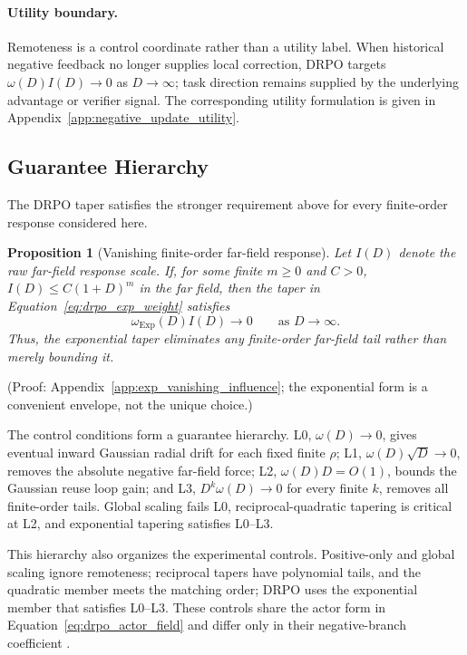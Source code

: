 \documentclass{article}
\theoremstyle{plain}
\newtheorem{proposition}[theorem]{Proposition}
\theoremstyle{definition}
\theoremstyle{remark}
\begin{document}
\paragraph{Utility boundary.}
\label{subsec:distance_dependent_utility}
Remoteness is a control coordinate rather than a utility label. When
historical negative feedback no longer supplies local correction, DRPO
targets \(\omega(D)I(D)\to0\) as \(D\to\infty\); task direction remains
supplied by the underlying advantage or verifier signal. The corresponding
utility formulation is given in
Appendix~\ref{app:negative_update_utility}.

\subsection{Guarantee Hierarchy}
\label{sec:exponential_taper}

The DRPO taper satisfies the stronger requirement above for every
finite-order response considered here.

\begin{proposition}[Vanishing finite-order far-field response]
\label{prop:exp_vanishing_influence}
Let \(I(D)\) denote the raw far-field response scale. If, for some
finite \(m\geq0\) and \(C>0\),
\(I(D)\leq C(1+D)^m\) in the far field, then the taper in
Equation~\eqref{eq:drpo_exp_weight} satisfies
\[
    \omega_{\mathrm{Exp}}(D) I(D)
    \longrightarrow 0
    \qquad
    \text{as }D\to\infty .
\]
Thus, the exponential taper eliminates any finite-order far-field tail
rather than merely bounding it.
\end{proposition}

(Proof: Appendix~\ref{app:exp_vanishing_influence}; the exponential form is
a convenient envelope, not the unique choice.)

The control conditions form a guarantee hierarchy. L0,
\(\omega(D)\to0\), gives eventual inward Gaussian radial drift for each
fixed finite \(\rho\); L1, \(\omega(D)\sqrt D\to0\), removes the
absolute negative far-field force; L2, \(\omega(D)D=O(1)\), bounds the
Gaussian reuse loop gain; and L3,
\(D^k\omega(D)\to0\) for every finite \(k\), removes all finite-order
tails. Global scaling fails L0, reciprocal-quadratic tapering is critical at
L2, and exponential tapering satisfies L0--L3. 

This hierarchy also organizes the experimental controls. Positive-only and
global scaling ignore remoteness; reciprocal tapers have polynomial tails, and the quadratic member meets the matching
order; DRPO uses the exponential member that satisfies
L0--L3. These controls share the actor form in
Equation~\eqref{eq:drpo_actor_field} and differ only in their negative-branch
coefficient \citep{peng2019advantage,nair2020awac,kostrikov2021offline,
grigsby2021closer,arnal2025asymmetric,leroux2025tapered}.
\end{document}
